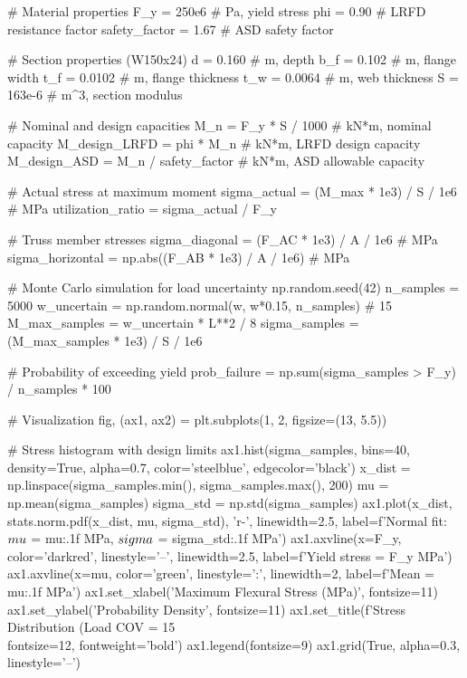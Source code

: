 \documentclass[11pt,a4paper]{article}
\begin{document}
\begin{pycode}
# Material properties
F_y = 250e6  # Pa, yield stress
phi = 0.90  # LRFD resistance factor
safety_factor = 1.67  # ASD safety factor

# Section properties (W150x24)
d = 0.160  # m, depth
b_f = 0.102  # m, flange width
t_f = 0.0102  # m, flange thickness
t_w = 0.0064  # m, web thickness
S = 163e-6  # m^3, section modulus

# Nominal and design capacities
M_n = F_y * S / 1000  # kN*m, nominal capacity
M_design_LRFD = phi * M_n  # kN*m, LRFD design capacity
M_design_ASD = M_n / safety_factor  # kN*m, ASD allowable capacity

# Actual stress at maximum moment
sigma_actual = (M_max * 1e3) / S / 1e6  # MPa
utilization_ratio = sigma_actual / F_y

# Truss member stresses
sigma_diagonal = (F_AC * 1e3) / A / 1e6  # MPa
sigma_horizontal = np.abs((F_AB * 1e3) / A / 1e6)  # MPa

# Monte Carlo simulation for load uncertainty
np.random.seed(42)
n_samples = 5000
w_uncertain = np.random.normal(w, w*0.15, n_samples)  # 15%
M_max_samples = w_uncertain * L**2 / 8
sigma_samples = (M_max_samples * 1e3) / S / 1e6

# Probability of exceeding yield
prob_failure = np.sum(sigma_samples > F_y) / n_samples * 100

# Visualization
fig, (ax1, ax2) = plt.subplots(1, 2, figsize=(13, 5.5))

# Stress histogram with design limits
ax1.hist(sigma_samples, bins=40, density=True, alpha=0.7, color='steelblue', edgecolor='black')
x_dist = np.linspace(sigma_samples.min(), sigma_samples.max(), 200)
mu = np.mean(sigma_samples)
sigma_std = np.std(sigma_samples)
ax1.plot(x_dist, stats.norm.pdf(x_dist, mu, sigma_std), 'r-', linewidth=2.5,
         label=f'Normal fit: $\\mu$ = {mu:.1f} MPa, $\\sigma$ = {sigma_std:.1f} MPa')
ax1.axvline(x=F_y, color='darkred', linestyle='--', linewidth=2.5, label=f'Yield stress = {F_y} MPa')
ax1.axvline(x=mu, color='green', linestyle=':', linewidth=2, label=f'Mean = {mu:.1f} MPa')
ax1.set_xlabel('Maximum Flexural Stress (MPa)', fontsize=11)
ax1.set_ylabel('Probability Density', fontsize=11)
ax1.set_title(f'Stress Distribution (Load COV = 15\\%
              fontsize=12, fontweight='bold')
ax1.legend(fontsize=9)
ax1.grid(True, alpha=0.3, linestyle='--')


\end{pycode}
\end{document}
